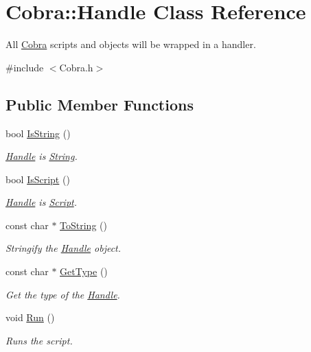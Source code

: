 \hypertarget{class_cobra_1_1_handle}{\section{Cobra\+:\+:Handle Class Reference}
\label{class_cobra_1_1_handle}
}


All \hyperlink{namespace_cobra}{Cobra} scripts and objects will be wrapped in a handler.  




{\ttfamily \#include $<$Cobra.\+h$>$}

\subsection*{Public Member Functions}
\begin{DoxyCompactItemize}
\item 
bool \hyperlink{class_cobra_1_1_handle_a1cd39727327efaaea04597acae87eca7}{Is\+String} ()
\begin{DoxyCompactList}\small\item\em \hyperlink{class_cobra_1_1_handle}{Handle} is \hyperlink{class_cobra_1_1_string}{String}. \end{DoxyCompactList}\item 
bool \hyperlink{class_cobra_1_1_handle_a4e641103844a622cec39b8e53f056112}{Is\+Script} ()
\begin{DoxyCompactList}\small\item\em \hyperlink{class_cobra_1_1_handle}{Handle} is \hyperlink{class_cobra_1_1_script}{Script}. \end{DoxyCompactList}\item 
const char $\ast$ \hyperlink{class_cobra_1_1_handle_a1cc4baae13a1fbf6d5d101b5fc5b11d5}{To\+String} ()
\begin{DoxyCompactList}\small\item\em Stringify the \hyperlink{class_cobra_1_1_handle}{Handle} object. \end{DoxyCompactList}\item 
const char $\ast$ \hyperlink{class_cobra_1_1_handle_a638691042734265cab9b15668fd72fc8}{Get\+Type} ()
\begin{DoxyCompactList}\small\item\em Get the type of the \hyperlink{class_cobra_1_1_handle}{Handle}. \end{DoxyCompactList}\item 
void \hyperlink{class_cobra_1_1_handle_a8315ff0b3b5abb81ca24f987cf81b6a8}{Run} ()
\begin{DoxyCompactList}\small\item\em Runs the script. \end{DoxyCompactList}\end{DoxyCompactItemize}


